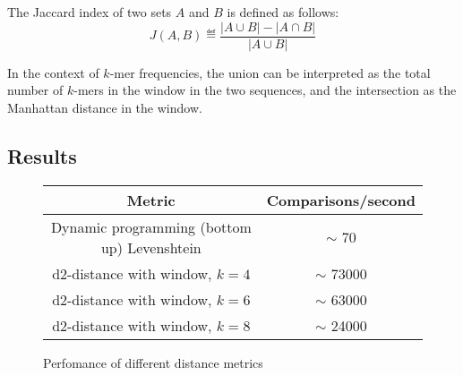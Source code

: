 The Jaccard index of two sets $A$ and $B$ is defined as follows:
\begin{equation}
  J(A, B) \eqdef \frac{|A \cup B| - |A \cap B|}{|A \cup B|}
\end{equation}

In the context of $k$-mer frequencies, the union can be interpreted as the
total number of $k$-mers in the window in the two sequences, and the
intersection as the Manhattan distance in the window.


\subsection{Results}
\begin{figure}[H]
\begin{tabular}{ c | c }
  Metric                                        & Comparisons/second      \\
  \hline
  Dynamic programming (bottom up) Levenshtein   & $\sim$ 70               \\
  d2-distance with window, $k=4$                & $\sim$ 73000            \\
  d2-distance with window, $k=6$                & $\sim$ 63000            \\
  d2-distance with window, $k=8$                & $\sim$ 24000            \\
\end{tabular}
\caption{Perfomance of different distance metrics}
\end{figure}
